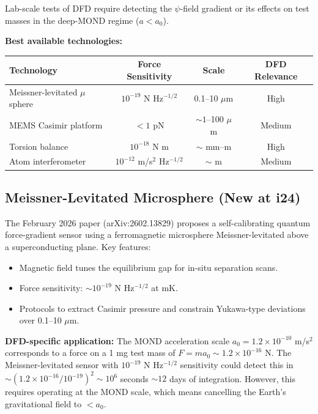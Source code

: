 \documentclass[11pt]{article}
\newcommand{\ee}[1]{\times 10^{#1}}
\newcommand{\aM}{a_0}
\begin{document}
Lab-scale tests of DFD require detecting the $\psi$-field gradient
or its effects on test masses in the deep-MOND regime ($a < \aM$).

\textbf{Best available technologies:}

\begin{center}
\begin{tabular}{lccc}
\toprule
\textbf{Technology} & \textbf{Force Sensitivity} & \textbf{Scale} & \textbf{DFD Relevance} \\
\midrule
Meissner-levitated $\mu$sphere & $10^{-19}$ N Hz$^{-1/2}$ & 0.1--10 $\mu$m & High \\
MEMS Casimir platform & $< 1$ pN & $\sim 1$--100 $\mu$m & Medium \\
Torsion balance & $10^{-18}$ N m & $\sim$ mm--m & High \\
Atom interferometer & $10^{-12}$ m/s$^2$ Hz$^{-1/2}$ & $\sim$ m & Medium \\
\bottomrule
\end{tabular}
\end{center}

\subsection{Meissner-Levitated Microsphere (New at i24)}

The February 2026 paper (arXiv:2602.13829) proposes a self-calibrating
quantum force-gradient sensor using a ferromagnetic microsphere
Meissner-levitated above a superconducting plane. Key features:

\begin{itemize}
  \item Magnetic field tunes the equilibrium gap for in-situ separation
    scans.
  \item Force sensitivity: $\sim 10^{-19}$ N Hz$^{-1/2}$ at mK.
  \item Protocols to extract Casimir pressure and constrain Yukawa-type
    deviations over 0.1--10 $\mu$m.
\end{itemize}

\textbf{DFD-specific application:} The MOND acceleration scale
$\aM = 1.2 \ee{-10}$ m/s$^2$ corresponds to a force on a 1 mg test
mass of $F = m\aM \sim 1.2 \ee{-16}$ N. The Meissner-levitated sensor
with $10^{-19}$ N Hz$^{-1/2}$ sensitivity could detect this in
$\sim (1.2 \ee{-16}/10^{-19})^2 \sim 10^6$ seconds $\sim 12$ days
of integration. However, this requires operating at the MOND scale,
which means cancelling the Earth's gravitational field to $< \aM$.
\end{document}
